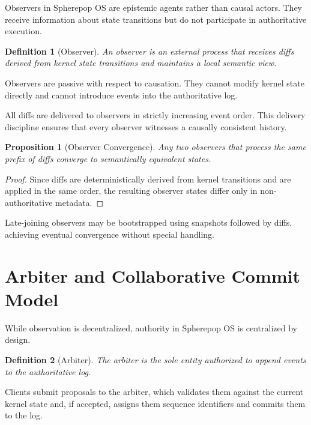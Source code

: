 \documentclass[11pt]{article}
\newtheorem{definition}{Definition}[section]
\newtheorem{proposition}{Proposition}[section]
\begin{document}
Observers in Spherepop OS are epistemic agents rather than causal actors.
They receive information about state transitions but do not participate in
authoritative execution.

\begin{definition}[Observer]
An observer is an external process that receives diffs derived from kernel
state transitions and maintains a local semantic view.
\end{definition}

Observers are passive with respect to causation. They cannot modify kernel
state directly and cannot introduce events into the authoritative log.

All diffs are delivered to observers in strictly increasing event order.
This delivery discipline ensures that every observer witnesses a causally
consistent history.

\begin{proposition}[Observer Convergence]
Any two observers that process the same prefix of diffs converge to
semantically equivalent states.
\end{proposition}

\begin{proof}
Since diffs are deterministically derived from kernel transitions and are
applied in the same order, the resulting observer states differ only in
non-authoritative metadata.
\end{proof}

Late-joining observers may be bootstrapped using snapshots followed by
diffs, achieving eventual convergence without special handling.

\section{Arbiter and Collaborative Commit Model}

While observation is decentralized, authority in Spherepop OS is centralized
by design.

\begin{definition}[Arbiter]
The arbiter is the sole entity authorized to append events to the
authoritative log.
\end{definition}

Clients submit proposals to the arbiter, which validates them against the
current kernel state and, if accepted, assigns them sequence identifiers and
commits them to the log.
\end{document}
